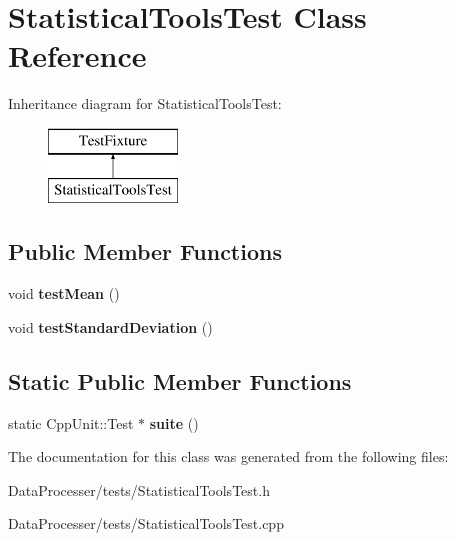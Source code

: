 \hypertarget{classStatisticalToolsTest}{}\section{Statistical\+Tools\+Test Class Reference}
\label{classStatisticalToolsTest}
Inheritance diagram for Statistical\+Tools\+Test\+:\begin{figure}[H]
\begin{center}
\leavevmode
\includegraphics[height=2.000000cm]{classStatisticalToolsTest}
\end{center}
\end{figure}
\subsection*{Public Member Functions}
\begin{DoxyCompactItemize}
\item 
\mbox{\label{classStatisticalToolsTest_aa9318bda5f30d8bd4e55d73e2afaeca7}} 
void {\bfseries test\+Mean} ()
\item 
\mbox{\label{classStatisticalToolsTest_a8aad8e70798d8691cb90658c82069a12}} 
void {\bfseries test\+Standard\+Deviation} ()
\end{DoxyCompactItemize}
\subsection*{Static Public Member Functions}
\begin{DoxyCompactItemize}
\item 
\mbox{\label{classStatisticalToolsTest_aa983611e198dba8c31fc572cf0366217}} 
static Cpp\+Unit\+::\+Test $\ast$ {\bfseries suite} ()
\end{DoxyCompactItemize}


The documentation for this class was generated from the following files\+:\begin{DoxyCompactItemize}
\item 
Data\+Processer/tests/Statistical\+Tools\+Test.\+h\item 
Data\+Processer/tests/Statistical\+Tools\+Test.\+cpp\end{DoxyCompactItemize}
